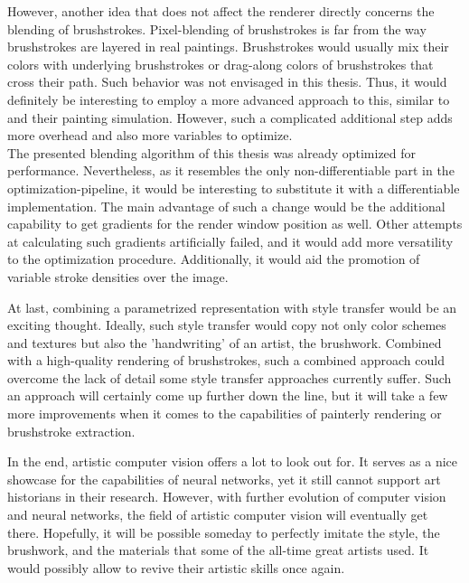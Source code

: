 However, another idea that does not affect the renderer directly concerns the blending of brushstrokes.
Pixel-blending of brushstrokes is far from the way brushstrokes are layered in real paintings.
Brushstrokes would usually mix their colors with underlying brushstrokes or drag-along colors of brushstrokes that cross their path.
Such behavior was not envisaged in this thesis.
Thus, it would definitely be interesting to employ a more advanced approach to this, similar to \citeauthor*{wetbrush} and their painting simulation.
However, such a complicated additional step adds more overhead and also more variables to optimize.\\
The presented blending algorithm of this thesis was already optimized for performance.
Nevertheless, as it resembles the only non-differentiable part in the optimization-pipeline, it would be interesting to substitute it with a differentiable implementation.
The main advantage of such a change would be the additional capability to get gradients for the render window position as well.
Other attempts at calculating such gradients artificially failed, and it would add more versatility to the optimization procedure.
Additionally, it would aid the promotion of variable stroke densities over the image.

At last, combining a parametrized representation with style transfer would be an exciting thought.
Ideally, such style transfer would copy not only color schemes and textures but also the 'handwriting' of an artist, the brushwork.
Combined with a high-quality rendering of brushstrokes, such a combined approach could overcome the lack of detail some style transfer approaches currently suffer.
Such an approach will certainly come up further down the line, but it will take a few more improvements when it comes to the capabilities of painterly rendering or brushstroke extraction.

In the end, artistic computer vision offers a lot to look out for.
It serves as a nice showcase for the capabilities of neural networks, yet it still cannot support art historians in their research.
However, with further evolution of computer vision and neural networks, the field of artistic computer vision will eventually get there.
Hopefully, it will be possible someday to perfectly imitate the style, the brushwork, and the materials that some of the all-time great artists used.
It would possibly allow to revive their artistic skills once again.


